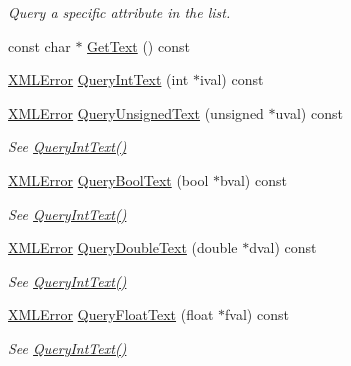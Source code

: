 \begin{DoxyCompactItemize}
\begin{DoxyCompactList}\small\item\em Query a specific attribute in the list. \end{DoxyCompactList}\item 
const char $\ast$ \hyperlink{classtinyxml2_1_1_x_m_l_element_a56cc727044dad002b978256754d43a4b}{Get\-Text} () const 
\item 
\hyperlink{namespacetinyxml2_a1fbf88509c3ac88c09117b1947414e08}{X\-M\-L\-Error} \hyperlink{classtinyxml2_1_1_x_m_l_element_a71327c9a9d8840562bd204f46d0a7189}{Query\-Int\-Text} (int $\ast$ival) const 
\item 
\hyperlink{namespacetinyxml2_a1fbf88509c3ac88c09117b1947414e08}{X\-M\-L\-Error} \hyperlink{classtinyxml2_1_1_x_m_l_element_a2192091dec0c06be8b14f4e912c01758}{Query\-Unsigned\-Text} (unsigned $\ast$uval) const 
\begin{DoxyCompactList}\small\item\em See \hyperlink{classtinyxml2_1_1_x_m_l_element_a71327c9a9d8840562bd204f46d0a7189}{Query\-Int\-Text()} \end{DoxyCompactList}\item 
\hyperlink{namespacetinyxml2_a1fbf88509c3ac88c09117b1947414e08}{X\-M\-L\-Error} \hyperlink{classtinyxml2_1_1_x_m_l_element_afeb060672fa934163fc573e692b7fe38}{Query\-Bool\-Text} (bool $\ast$bval) const 
\begin{DoxyCompactList}\small\item\em See \hyperlink{classtinyxml2_1_1_x_m_l_element_a71327c9a9d8840562bd204f46d0a7189}{Query\-Int\-Text()} \end{DoxyCompactList}\item 
\hyperlink{namespacetinyxml2_a1fbf88509c3ac88c09117b1947414e08}{X\-M\-L\-Error} \hyperlink{classtinyxml2_1_1_x_m_l_element_aad931c42548907dbea416f7365d78b57}{Query\-Double\-Text} (double $\ast$dval) const 
\begin{DoxyCompactList}\small\item\em See \hyperlink{classtinyxml2_1_1_x_m_l_element_a71327c9a9d8840562bd204f46d0a7189}{Query\-Int\-Text()} \end{DoxyCompactList}\item 
\hyperlink{namespacetinyxml2_a1fbf88509c3ac88c09117b1947414e08}{X\-M\-L\-Error} \hyperlink{classtinyxml2_1_1_x_m_l_element_a11fa26e1dbca88e973964c1d9b597658}{Query\-Float\-Text} (float $\ast$fval) const 
\begin{DoxyCompactList}\small\item\em See \hyperlink{classtinyxml2_1_1_x_m_l_element_a71327c9a9d8840562bd204f46d0a7189}{Query\-Int\-Text()} \end{DoxyCompactList}\item 

\end{DoxyCompactItemize}
